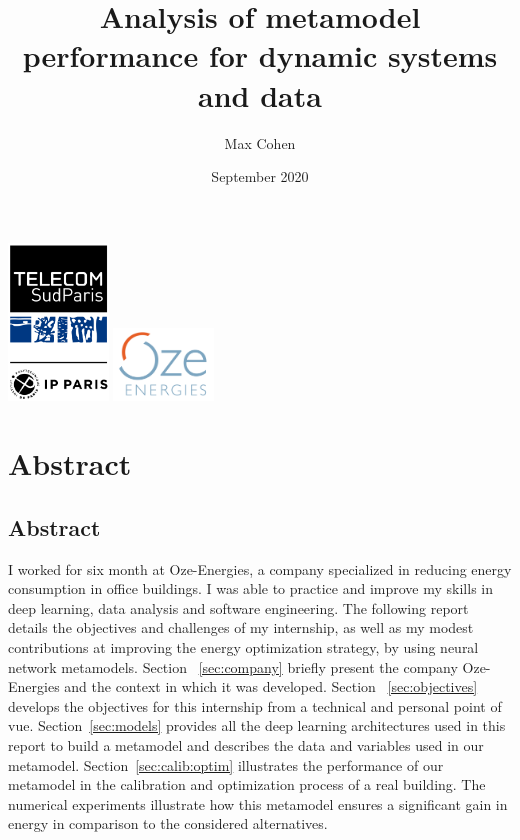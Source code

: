 \documentclass[12pt]{article}
\title{Analysis of metamodel performance for dynamic systems and data}
\author{Max Cohen}
\date{September 2020}
\begin{document}
\begin{titlepage}

    \maketitle

    \begin{center}
        \includegraphics[width=0.2\textwidth]{IPP_Endos_TelecomSudParis_RVB.png}
        \includegraphics[width=0.2\textwidth]{oze_logo.png}    
    \end{center}

\end{titlepage}

\tableofcontents

\section{Abstract}
\subsection{Abstract}
I worked for six month at Oze-Energies, a company specialized in reducing energy consumption in office buildings. I  was  able  to  practice  and  improve  my skills in deep learning, data analysis and software engineering. The following report details the objectives and challenges of my internship, as well as my modest contributions at improving the energy optimization strategy, by using neural network metamodels. Section ~\ref{sec:company} briefly present the company Oze-Energies and the context in which it was developed. Section ~\ref{sec:objectives} develops the objectives for this internship from a technical and personal point of vue. Section~\ref{sec:models} provides all the deep learning architectures used in this report to build a metamodel and describes the data and variables used in our metamodel. Section~\ref{sec:calib:optim} illustrates the performance of our metamodel in the calibration and optimization process of a real building. The numerical experiments illustrate how this metamodel ensures a significant gain in energy in comparison to the considered alternatives.
\end{document}
